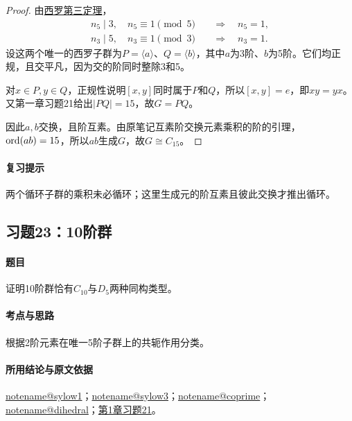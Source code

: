 \documentclass[UTF8,a4paper,11pt,fontset=windows]{ctexart}
\makeatletter
\newcommand{\noteref}[1]{\hyperref[note:#1]{\csname notename@#1\endcsname}}
\newcommand{\proofref}[2]{\hyperref[note:#1]{#2}}
\newcommand{\exref}[2]{\hyperref[ex:#1:#2]{第#1章习题#2}}
\makeatother
\begin{document}
\begin{proof}
由\proofref{sylow3}{西罗第三定理}，
\begin{align*}
n_5\mid3,\quad n_5\equiv1\pmod5&\quad\Longrightarrow\quad n_5=1,\\
n_3\mid5,\quad n_3\equiv1\pmod3&\quad\Longrightarrow\quad n_3=1.
\end{align*}
设这两个唯一的西罗子群为$P=\langle a\rangle$、$Q=\langle b\rangle$，其中$a$为3阶、$b$为5阶。它们均正规，且交平凡，因为交的阶同时整除3和5。

对$x\in P,y\in Q$，正规性说明$[x,y]$同时属于$P$和$Q$，所以$[x,y]=e$，即$xy=yx$。又第一章习题21给出$|PQ|=15$，故$G=PQ$。

因此$a,b$交换，且阶互素。由原笔记互素阶交换元素乘积的阶的引理，$\operatorname{ord}(ab)=15$，所以$ab$生成$G$，故$G\cong C_{15}$。
\end{proof}

\paragraph{复习提示}
两个循环子群的乘积未必循环；这里生成元的阶互素且彼此交换才推出循环。


\subsection{习题23：\texorpdfstring{10阶群}{10阶群}}
\label{ex:2:23}

\paragraph{题目}
证明10阶群恰有$C_{10}$与$D_5$两种同构类型。

\paragraph{考点与思路}
根据2阶元素在唯一5阶子群上的共轭作用分类。

\paragraph{所用结论与原文依据}
\noteref{sylow1}；\noteref{sylow3}；\noteref{coprime}；\noteref{dihedral}；\exref{1}{21}。

\end{document}

